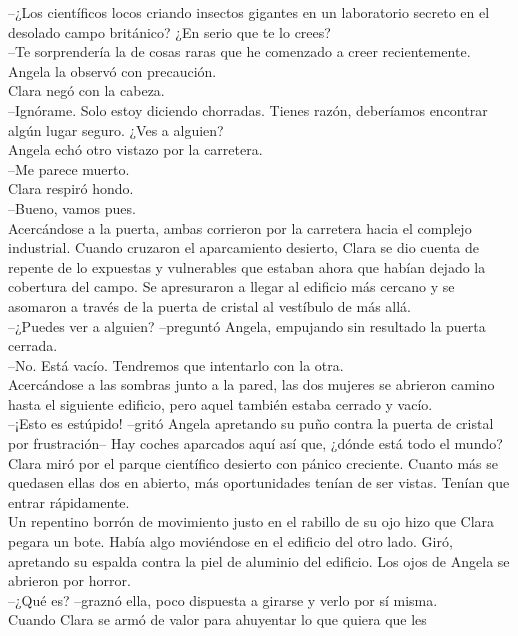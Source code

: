 --¿Los científicos locos criando insectos gigantes en un laboratorio
secreto en el desolado campo británico? ¿En serio que te lo crees?\\
--Te sorprendería la de cosas raras que he comenzado a creer
recientemente.\\
Angela la observó con precaución.\\
Clara negó con la cabeza.\\
--Ignórame. Solo estoy diciendo chorradas. Tienes razón, deberíamos
encontrar algún lugar seguro. ¿Ves a alguien?\\
Angela echó otro vistazo por la carretera.\\
--Me parece muerto.\\
Clara respiró hondo.\\
--Bueno, vamos pues.\\
Acercándose a la puerta, ambas corrieron por la carretera hacia el
complejo industrial. Cuando cruzaron el aparcamiento desierto, Clara se
dio cuenta de repente de lo expuestas y vulnerables que estaban ahora
que habían dejado la cobertura del campo. Se apresuraron a llegar al
edificio más cercano y se asomaron a través de la puerta de cristal al
vestíbulo de más allá.\\
--¿Puedes ver a alguien? --preguntó Angela, empujando sin resultado la
puerta cerrada.\\
--No. Está vacío. Tendremos que intentarlo con la otra.\\
Acercándose a las sombras junto a la pared, las dos mujeres se abrieron
camino hasta el siguiente edificio, pero aquel también estaba cerrado y
vacío.\\
--¡Esto es estúpido! --gritó Angela apretando su puño contra la puerta
de cristal por frustración-- Hay coches aparcados aquí así que, ¿dónde
está todo el mundo?\\
Clara miró por el parque científico desierto con pánico creciente.
Cuanto más se quedasen ellas dos en abierto, más oportunidades tenían de
ser vistas. Tenían que entrar rápidamente.\\
Un repentino borrón de movimiento justo en el rabillo de su ojo hizo que
Clara pegara un bote. Había algo moviéndose en el edificio del otro
lado. Giró, apretando su espalda contra la piel de aluminio del
edificio. Los ojos de Angela se abrieron por horror.\\
--¿Qué es? --graznó ella, poco dispuesta a girarse y verlo por sí
misma.\\
Cuando Clara se armó de valor para ahuyentar lo que quiera que les

